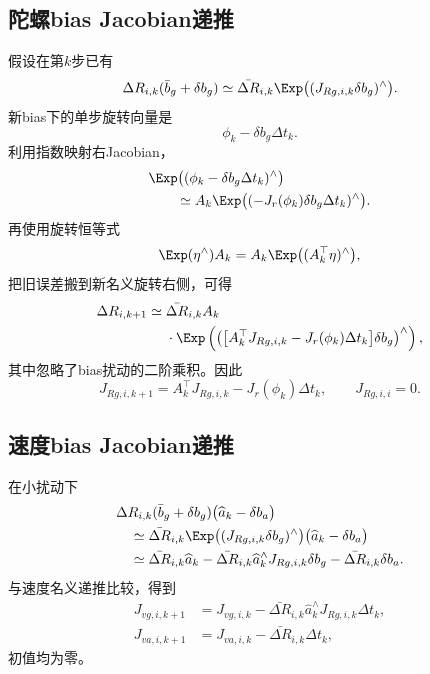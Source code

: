 \subsection{陀螺bias Jacobian递推}

假设在第$k$步已有
\[
    \Delta R_{i,k}(\bar b_g+\delta b_g)
    \simeq
    \bar{\Delta R}_{i,k}
    \Exp\bigl((J_{R g,i,k}\delta b_g)^\wedge\bigr).
\]
新bias下的单步旋转向量是
\[
    \phi_k-\delta b_g\Delta t_k.
\]
利用指数映射右Jacobian，
\[
\begin{aligned}
    &\Exp\bigl((\phi_k-\delta b_g\Delta t_k)^\wedge\bigr)\\
    &\qquad\simeq
    A_k
    \Exp\bigl((-J_r(\phi_k)\delta b_g\Delta t_k)^\wedge\bigr).
\end{aligned}
\]
再使用旋转恒等式
\[
    \Exp(\eta^\wedge)A_k
    =A_k\Exp\bigl((A_k^\top\eta)^\wedge\bigr),
\]
把旧误差搬到新名义旋转右侧，可得
\[
\begin{aligned}
    \Delta R_{i,k+1}
    \simeq{}&
    \bar{\Delta R}_{i,k}A_k\\
    &\cdot\Exp\left(
      \left(
        \bigl[A_k^\top J_{R g,i,k}
        -J_r(\phi_k)\Delta t_k\bigr]\delta b_g
      \right)^\wedge
    \right),
\end{aligned}
\]
其中忽略了bias扰动的二阶乘积。因此
\[
\boxed{
    J_{R g,i,k+1}
    =A_k^\top J_{R g,i,k}
    -J_r(\phi_k)\Delta t_k,
    \qquad
    J_{R g,i,i}=0.
}
\]

\subsection{速度bias Jacobian递推}

在小扰动下
\[
\begin{aligned}
    &\Delta R_{i,k}(\bar b_g+\delta b_g)
      \bigl(\widehat a_k-\delta b_a\bigr)\\
    &\quad\simeq
    \bar{\Delta R}_{i,k}
    \Exp\bigl((J_{R g,i,k}\delta b_g)^\wedge\bigr)
    \bigl(\widehat a_k-\delta b_a\bigr)\\
    &\quad\simeq
    \bar{\Delta R}_{i,k}\widehat a_k
    -\bar{\Delta R}_{i,k}\widehat a_k^\wedge
     J_{R g,i,k}\delta b_g
    -\bar{\Delta R}_{i,k}\delta b_a.
\end{aligned}
\]
与速度名义递推比较，得到
\[
\boxed{
\begin{aligned}
    J_{v g,i,k+1}
    &=J_{v g,i,k}
      -\bar{\Delta R}_{i,k}\widehat a_k^\wedge
       J_{R g,i,k}\Delta t_k,\\
    J_{v a,i,k+1}
    &=J_{v a,i,k}
      -\bar{\Delta R}_{i,k}\Delta t_k,
\end{aligned}
}
\]
初值均为零。

